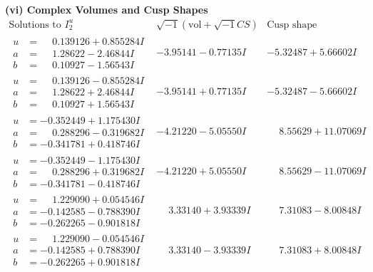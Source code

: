 \documentclass[1p]{elsarticle_modified}
\theoremstyle{definition}
\newcommand{\I}{\sqrt{-1}}
\begin{document}
\newpage\flushleft \textbf{(vi) Complex Volumes and Cusp Shapes}
$$\begin{array}{c|c|c}  
\text{Solutions to }I^u_{2}& \I (\text{vol} + \sqrt{-1}CS) & \text{Cusp shape}\\
 \hline 
\begin{aligned}
u &= \phantom{-}0.139126 + 0.855284 I \\
a &= \phantom{-}1.28622 - 2.46844 I \\
b &= \phantom{-}0.10927 - 1.56543 I\end{aligned}
 & -3.95141 - 0.77135 I & -5.32487 + 5.66602 I \\ \hline\begin{aligned}
u &= \phantom{-}0.139126 - 0.855284 I \\
a &= \phantom{-}1.28622 + 2.46844 I \\
b &= \phantom{-}0.10927 + 1.56543 I\end{aligned}
 & -3.95141 + 0.77135 I & -5.32487 - 5.66602 I \\ \hline\begin{aligned}
u &= -0.352449 + 1.175430 I \\
a &= \phantom{-}0.288296 - 0.319682 I \\
b &= -0.341781 + 0.418746 I\end{aligned}
 & -4.21220 - 5.05550 I & \phantom{-}8.55629 + 11.07069 I \\ \hline\begin{aligned}
u &= -0.352449 - 1.175430 I \\
a &= \phantom{-}0.288296 + 0.319682 I \\
b &= -0.341781 - 0.418746 I\end{aligned}
 & -4.21220 + 5.05550 I & \phantom{-}8.55629 - 11.07069 I \\ \hline\begin{aligned}
u &= \phantom{-}1.229090 + 0.054546 I \\
a &= -0.142585 - 0.788390 I \\
b &= -0.262265 - 0.901818 I\end{aligned}
 & \phantom{-}3.33140 + 3.93339 I & \phantom{-}7.31083 - 8.00848 I \\ \hline\begin{aligned}
u &= \phantom{-}1.229090 - 0.054546 I \\
a &= -0.142585 + 0.788390 I \\
b &= -0.262265 + 0.901818 I\end{aligned}
 & \phantom{-}3.33140 - 3.93339 I & \phantom{-}7.31083 + 8.00848 I \\ \hline\begin{aligned}

\end{aligned}
\end{array}$$
\end{document}
